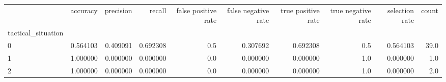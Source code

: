 \begin{tabular}{lrrrrrrrrr}
\toprule
{} &  accuracy &  precision &    recall &  false positive rate &  false negative rate &  true positive rate &  true negative rate &  selection rate &  count \\
tactical\_situation &           &            &           &                      &                      &                     &                     &                 &        \\
\midrule
0                  &  0.564103 &   0.409091 &  0.692308 &                  0.5 &             0.307692 &            0.692308 &                 0.5 &        0.564103 &   39.0 \\
1                  &  1.000000 &   0.000000 &  0.000000 &                  0.0 &             0.000000 &            0.000000 &                 1.0 &        0.000000 &    1.0 \\
2                  &  1.000000 &   0.000000 &  0.000000 &                  0.0 &             0.000000 &            0.000000 &                 1.0 &        0.000000 &    2.0 \\
\bottomrule
\end{tabular}
